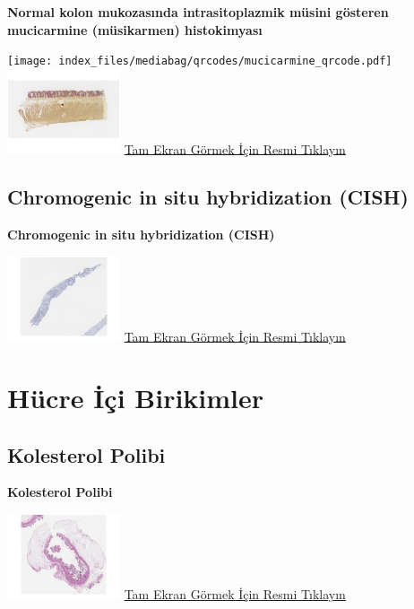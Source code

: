 \documentclass[
  letterpaper,
  DIV=11,
  numbers=noendperiod]{scrreprt}
\begin{document}
\textbf{Normal kolon mukozasında intrasitoplazmik müsini gösteren
mucicarmine (müsikarmen) histokimyası}

\texttt{[image: index\_files/mediabag/qrcodes/mucicarmine\_qrcode.pdf]}
\href{https://images.patolojiatlasi.com/mucin/mucicarmine.html}{\includegraphics[width=0.25\textwidth,height=\textheight]{./screenshots/thumbnail_mucicarmine.png}}
\href{https://images.patolojiatlasi.com/mucin/mucicarmine.html}{Tam
Ekran Görmek İçin Resmi Tıklayın}

\hypertarget{sec-chromogenic-in-situ-hybridization-cish}{%
\section{Chromogenic in situ hybridization
(CISH)}\label{sec-chromogenic-in-situ-hybridization-cish}}

\textbf{Chromogenic in situ hybridization (CISH)}

\href{https://images.patolojiatlasi.com/her2-cish/cish.html}{\includegraphics[width=0.25\textwidth,height=\textheight]{./screenshots/thumbnail_cish.png}}
\href{https://images.patolojiatlasi.com/her2-cish/cish.html}{Tam Ekran
Görmek İçin Resmi Tıklayın}

\hypertarget{sec-hucre-ici-birikimler}{%
\chapter{Hücre İçi Birikimler}\label{sec-hucre-ici-birikimler}}

\hypertarget{sec-kolesterol-polibi}{%
\section{Kolesterol Polibi}\label{sec-kolesterol-polibi}}

\textbf{Kolesterol Polibi}

\href{https://images.patolojiatlasi.com/cholesterolpolyp/HE.html}{\includegraphics[width=0.25\textwidth,height=\textheight]{./screenshots/thumbnail_cholesterolpolyp.png}}
\href{https://images.patolojiatlasi.com/cholesterolpolyp/HE.html}{Tam
Ekran Görmek İçin Resmi Tıklayın}
\end{document}

